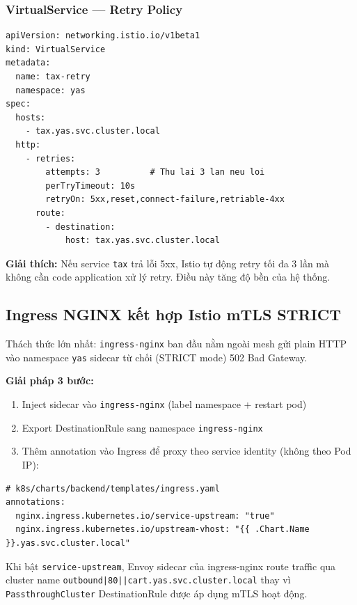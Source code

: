 \subsubsection{VirtualService — Retry Policy}

\begin{lstlisting}[style=yamlstyle, caption=istio/virtual-service-retry.yaml (trích)]
apiVersion: networking.istio.io/v1beta1
kind: VirtualService
metadata:
  name: tax-retry
  namespace: yas
spec:
  hosts:
    - tax.yas.svc.cluster.local
  http:
    - retries:
        attempts: 3          # Thu lai 3 lan neu loi
        perTryTimeout: 10s
        retryOn: 5xx,reset,connect-failure,retriable-4xx
      route:
        - destination:
            host: tax.yas.svc.cluster.local
\end{lstlisting}

\textbf{Giải thích:} Nếu service \texttt{tax} trả lỗi 5xx, Istio tự động retry tối đa 3 lần
mà không cần code application xử lý retry. Điều này tăng độ bền của hệ thống.

\subsection{Ingress NGINX kết hợp Istio mTLS STRICT}

Thách thức lớn nhất: \texttt{ingress-nginx} ban đầu nằm ngoài mesh \textrightarrow{} gửi plain HTTP
vào namespace \texttt{yas} \textrightarrow{} sidecar từ chối (STRICT mode) \textrightarrow{} 502 Bad Gateway.

\textbf{Giải pháp 3 bước:}
\begin{enumerate}
	\item Inject sidecar vào \texttt{ingress-nginx} (label namespace + restart pod)
	\item Export DestinationRule sang namespace \texttt{ingress-nginx}
	\item Thêm annotation vào Ingress để proxy theo service identity (không theo Pod IP):
\end{enumerate}

\begin{lstlisting}[style=yamlstyle, caption=Annotation Ingress để ingress-nginx dùng service identity]
# k8s/charts/backend/templates/ingress.yaml
annotations:
  nginx.ingress.kubernetes.io/service-upstream: "true"
  nginx.ingress.kubernetes.io/upstream-vhost: "{{ .Chart.Name }}.yas.svc.cluster.local"
\end{lstlisting}

Khi bật \texttt{service-upstream}, Envoy sidecar của ingress-nginx route traffic qua
cluster name \texttt{outbound|80||cart.yas.svc.cluster.local} thay vì
\texttt{PassthroughCluster} \textrightarrow{} DestinationRule được áp dụng \textrightarrow{} mTLS hoạt động.

